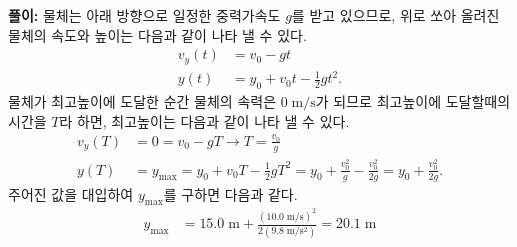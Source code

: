 \documentclass[floatfix,nofootinbib,superscriptaddress,fleqn,preprint]{revtex4-2}
\begin{document}
\noindent \textbf{풀이:}
물체는 아래 방향으로 일정한 중력가속도 $g$를 받고 있으므로, 
위로 쏘아 올려진 물체의 속도와 높이는 다음과 같이 나타 낼 수 있다.
\begin{align}
 \label{4-1}
v_{y}(t) &= v_{0} - gt \\
 \label{4-2}
y(t) &= y_{0} + v_{0}t - \frac{1}{2} g t^{2}.
\end{align}
물체가 최고높이에 도달한 순간 물체의 속력은 $0 \; \mathrm{m/s}$가 
되므로 최고높이에 도달할때의 시간을 $T$라 하면, 최고높이는 다음과 같이 나타 낼 수 있다.
\begin{align}
 \label{4-3}
v_{y}(T) &= 0 = v_{0} - gT \rightarrow T = \frac{v_{0}}{g} \\
 \label{4-4}
y(T) &= y_\mathrm{max} = y_{0} + v_{0}T - \frac{1}{2} g T^{2} 
  = y_{0} + \frac{v_{0}^{2}}{g} - \frac{v_{0}^{2}}{2g}
  = y_{0} + \frac{v_{0}^{2}}{2g}.
\end{align}
주어진 값을 대입하여 $y_\mathrm{max}$를 구하면 다음과 같다.
\begin{align}
 \label{4-5}
y_\mathrm{max} &= 15.0 \; \mathrm{m} + \frac{(10.0 \; \mathrm{m/s})^{2}}{2(9.8 \; \mathrm{m/s^{2}})}
  = 20.1 \; \mathrm{m}
\end{align}
\end{document}
